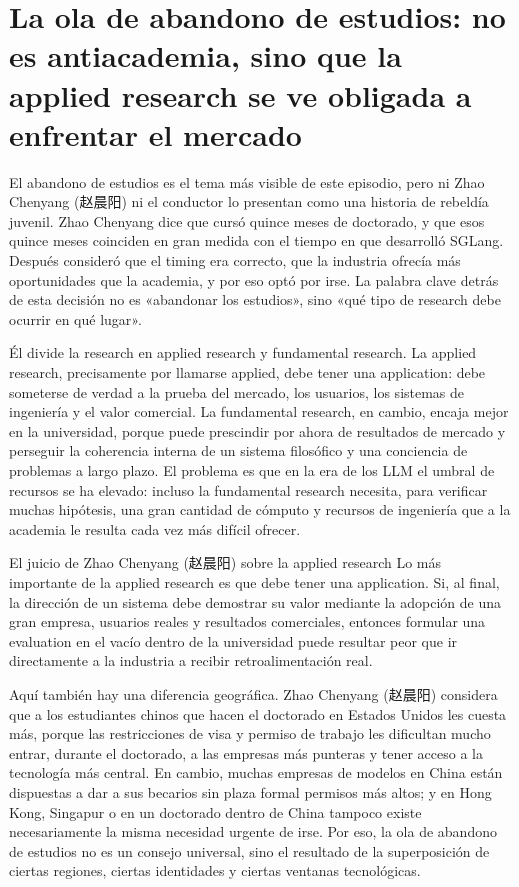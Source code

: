 \section{La ola de abandono de estudios: no es antiacademia, sino que la applied research se ve obligada a enfrentar el mercado}

El abandono de estudios es el tema más visible de este episodio, pero ni Zhao Chenyang (赵晨阳) ni el conductor lo presentan como una historia de rebeldía juvenil. Zhao Chenyang dice que cursó quince meses de doctorado, y que esos quince meses coinciden en gran medida con el tiempo en que desarrolló SGLang. Después consideró que el timing era correcto, que la industria ofrecía más oportunidades que la academia, y por eso optó por irse. La palabra clave detrás de esta decisión no es «abandonar los estudios», sino «qué tipo de research debe ocurrir en qué lugar».

Él divide la research en applied research y fundamental research. La applied research, precisamente por llamarse applied, debe tener una application: debe someterse de verdad a la prueba del mercado, los usuarios, los sistemas de ingeniería y el valor comercial. La fundamental research, en cambio, encaja mejor en la universidad, porque puede prescindir por ahora de resultados de mercado y perseguir la coherencia interna de un sistema filosófico y una conciencia de problemas a largo plazo. El problema es que en la era de los LLM el umbral de recursos se ha elevado: incluso la fundamental research necesita, para verificar muchas hipótesis, una gran cantidad de cómputo y recursos de ingeniería que a la academia le resulta cada vez más difícil ofrecer.

\begin{importantbox}{El juicio de Zhao Chenyang (赵晨阳) sobre la applied research}
Lo más importante de la applied research es que debe tener una application. Si, al final, la dirección de un sistema debe demostrar su valor mediante la adopción de una gran empresa, usuarios reales y resultados comerciales, entonces formular una evaluation en el vacío dentro de la universidad puede resultar peor que ir directamente a la industria a recibir retroalimentación real.
\end{importantbox}

Aquí también hay una diferencia geográfica. Zhao Chenyang (赵晨阳) considera que a los estudiantes chinos que hacen el doctorado en Estados Unidos les cuesta más, porque las restricciones de visa y permiso de trabajo les dificultan mucho entrar, durante el doctorado, a las empresas más punteras y tener acceso a la tecnología más central. En cambio, muchas empresas de modelos en China están dispuestas a dar a sus becarios sin plaza formal permisos más altos; y en Hong Kong, Singapur o en un doctorado dentro de China tampoco existe necesariamente la misma necesidad urgente de irse. Por eso, la ola de abandono de estudios no es un consejo universal, sino el resultado de la superposición de ciertas regiones, ciertas identidades y ciertas ventanas tecnológicas.

